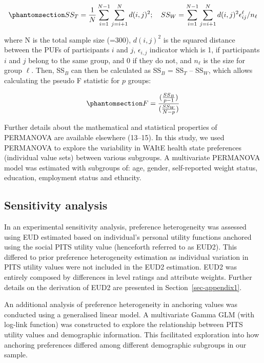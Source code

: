 \documentclass[
  letterpaper,
  DIV=11,
  numbers=noendperiod]{scrartcl}
\begin{document}
\begin{equation}\phantomsection\label{eq-sumsquares}{ 
    SS_{T} = \frac{1}{N}\sum_{i=1}^{N-1}\sum_{j=i+1}^{N}d(i,j)^{2}; \quad SS_{W} = \sum_{i=1}^{N-1}\sum_{j=i+1}^{N}d(i,j)^{2}\epsilon_{ij}^{\ell}/n_{\ell}
}\end{equation}

where N is the total sample size (=300), \(d(i,j)^2\) is the squared
distance between the PUFs of participants \(i\) and \(j\),
\(\epsilon_{i,j}\) indicator which is 1, if participants \(i\) and \(j\)
belong to the same group, and 0 if they do not, and \(n_{\ell}\) is the
size for group \(\ell\). Then, SS\(_B\) can then be calculated as
SS\(_B\) = SS\(_T\) -- SS\(_W\), which allows calculating the pseudo F
statistic for \(p\) groups:

\begin{equation}\phantomsection\label{eq-ssb}{
F= \frac{(\frac{SS_B}{p-1})}{(\frac{SS_W}{N-p})}
}\end{equation}

Further details about the mathematical and statistical properties of
PERMANOVA are available elsewhere (13--15). In this study, we used
PERMANOVA to explore the variability in WAItE health state preferences
(individual value sets) between various subgroups. A multivariate
PERMANOVA model was estimated with subgroups of: age, gender,
self-reported weight status, education, employment status and ethncity.

\subsection{Sensitivity analysis}\label{sensitivity-analysis}

In an experimental sensitivity analysis, preference heterogeneity was
assessed using EUD estimated based on individual's personal utility
functions anchored using the social PITS utility value (henceforth
referred to as EUD2). This differed to prior preference heterogeneity
estimation as individual variation in PITS utility values were not
included in the EUD2 estimation. EUD2 was entirely composed by
differences in level ratings and attribute weights. Further details on
the derivation of EUD2 are presented in Section~\ref{sec-appendix1}.

An additional analysis of preference heterogeneity in anchoring values
was conducted using a generalised linear model. A multivariate Gamma GLM
(with log-link function) was constructed to explore the relationship
between PITS utility values and demographic information. This
facilitated exploration into how anchoring preferences differed among
different demographic subgroups in our sample.
\end{document}
